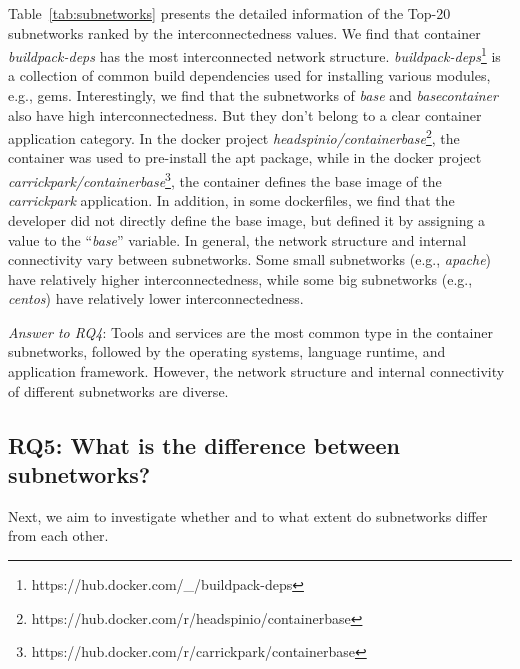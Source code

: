 \documentclass[sigconf]{acmart}
\begin{document}
Table~\ref{tab:subnetworks} presents the detailed information of the Top-20 subnetworks ranked by the interconnectedness values.  
We find that container \emph{buildpack-deps} has the most interconnected network structure. \emph{buildpack-deps}\footnote{https://hub.docker.com/\_/buildpack-deps} is a collection of common build dependencies used for installing various modules, e.g., gems. 
Interestingly, we find that the subnetworks of \emph{base} and \emph{basecontainer} also have high interconnectedness. But they don't belong to a clear container application category. In the docker project \emph{headspinio/containerbase}\footnote{https://hub.docker.com/r/headspinio/containerbase}, the container was used to pre-install the apt package, while in the docker project  \emph{carrickpark/containerbase}\footnote{https://hub.docker.com/r/carrickpark/containerbase}, the container defines the base image of the \emph{carrickpark} application. In addition, in some dockerfiles, we 
find that the developer did not directly define the base image, but defined it by assigning a value to the ``\emph{base}'' variable. 
In general, the network structure and internal connectivity vary between subnetworks. Some small subnetworks (e.g., \emph{apache}) have relatively higher interconnectedness, while some big subnetworks (e.g., \emph{centos}) have relatively lower interconnectedness.





\begin{mybox}
\emph{Answer to RQ4}: 
Tools and services are the most common type in the container subnetworks, followed by the operating systems, language runtime, and application framework. 
However, the network structure and internal connectivity of different subnetworks are diverse. 
\end{mybox}






\subsection{RQ5: What is the difference between subnetworks?}\label{AA}
Next, we aim to investigate whether and to what extent do subnetworks differ from each other.
\end{document}
